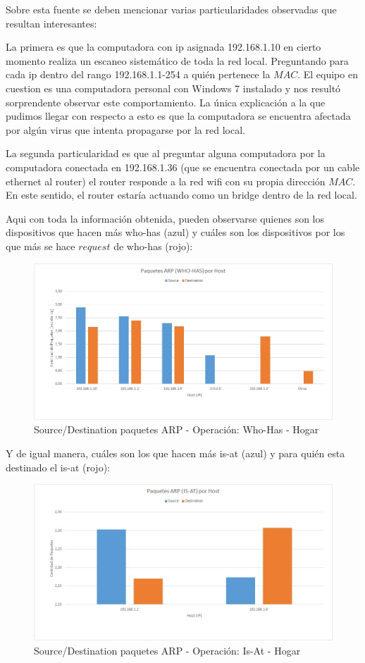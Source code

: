 Sobre esta fuente se deben mencionar varias particularidades observadas que resultan interesantes:

La primera es que la computadora con ip asignada 192.168.1.10 en cierto momento realiza un escaneo sistemático de toda la red local. Preguntando para cada ip dentro del rango 192.168.1.1-254 a quién pertenece la $MAC$. El equipo en cuestion es una computadora personal con Windows 7 instalado y nos resultó sorprendente observar este comportamiento. La única explicación a la que pudimos llegar con respecto a esto es que la computadora se encuentra afectada por algún virus que intenta propagarse por la red local.

La segunda particularidad es que al preguntar alguna computadora por la computadora conectada en 192.168.1.36 (que se encuentra conectada por un cable ethernet al router) el router responde a la red wifi con su propia dirección $MAC$. En este sentido, el router estaría actuando como un bridge dentro de la red local.

Aqui con toda la información obtenida, pueden observarse quienes son los dispositivos que hacen más who-has (azul) y cuáles son los dispositivos por los que más se hace $request$ de who-has (rojo):

\begin{figure}[h!]
\centering
\includegraphics[width=\textwidth]{./img/arp_whoHas_casa.jpg}
\caption{Source/Destination paquetes ARP - Operación: Who-Has - Hogar}
\end{figure}

Y de igual manera, cuáles son los que hacen más is-at (azul) y para quién esta destinado el is-at (rojo):

\begin{figure}[h!]
\centering
\includegraphics[width=\textwidth]{./img/arp_isAt_casa.jpg}
\caption{Source/Destination paquetes ARP - Operación: Is-At - Hogar}
\end{figure}

